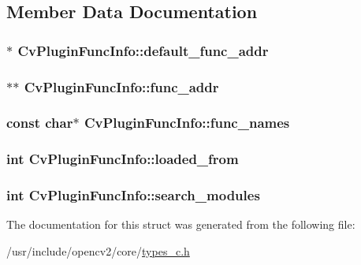 \subsection{Member Data Documentation}
\hypertarget{structCvPluginFuncInfo_adc995825bf8276f1332a9724014b753d}{
\subsubsection[{default\-\_\-func\-\_\-addr}]{$\ast$ Cv\-Plugin\-Func\-Info\-::default\-\_\-func\-\_\-addr}}\label{structCvPluginFuncInfo_adc995825bf8276f1332a9724014b753d}
\hypertarget{structCvPluginFuncInfo_a0f8c5dc69cbf48ba580bb8bc226622c6}{
\subsubsection[{func\-\_\-addr}]{$\ast$$\ast$ Cv\-Plugin\-Func\-Info\-::func\-\_\-addr}}\label{structCvPluginFuncInfo_a0f8c5dc69cbf48ba580bb8bc226622c6}
\hypertarget{structCvPluginFuncInfo_a91d414b5fe9137f058f1f0ff78bca630}{
\subsubsection[{func\-\_\-names}]{\setlength{\rightskip}{0pt plus 5cm}const char$\ast$ Cv\-Plugin\-Func\-Info\-::func\-\_\-names}}\label{structCvPluginFuncInfo_a91d414b5fe9137f058f1f0ff78bca630}
\hypertarget{structCvPluginFuncInfo_a32b220f7101b603e2208e7a1b48611af}{
\subsubsection[{loaded\-\_\-from}]{\setlength{\rightskip}{0pt plus 5cm}int Cv\-Plugin\-Func\-Info\-::loaded\-\_\-from}}\label{structCvPluginFuncInfo_a32b220f7101b603e2208e7a1b48611af}
\hypertarget{structCvPluginFuncInfo_aa205748f720a82d01edc1c4865e115fe}{
\subsubsection[{search\-\_\-modules}]{\setlength{\rightskip}{0pt plus 5cm}int Cv\-Plugin\-Func\-Info\-::search\-\_\-modules}}\label{structCvPluginFuncInfo_aa205748f720a82d01edc1c4865e115fe}


The documentation for this struct was generated from the following file\-:\begin{DoxyCompactItemize}
\item 
/usr/include/opencv2/core/\hyperlink{core_2types__c_8h}{types\-\_\-c.\-h}\end{DoxyCompactItemize}
